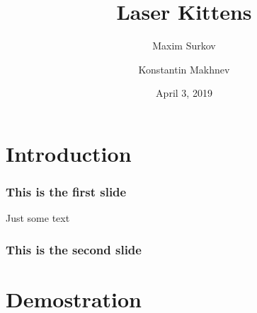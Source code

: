 \documentclass[12pt]{beamer}
\title[kittens] {Laser Kittens}
\author[Maxim Surkov, Konstantin Makhnev]
{Maxim Surkov \and Konstantin Makhnev}
\institute[Abstract University]
{
  Higher School of Economics
}
\date[date]
{April 3, 2019}
\begin{document}
\frame{\titlepage}

\section[Section] {Introduction}

\begin{frame}
    \frametitle{This is the first slide}
    Just some text
\end{frame}

\begin{frame}
    \frametitle{This is the second slide}
\end{frame}

\section[Section] {Demostration}
\end{document}
